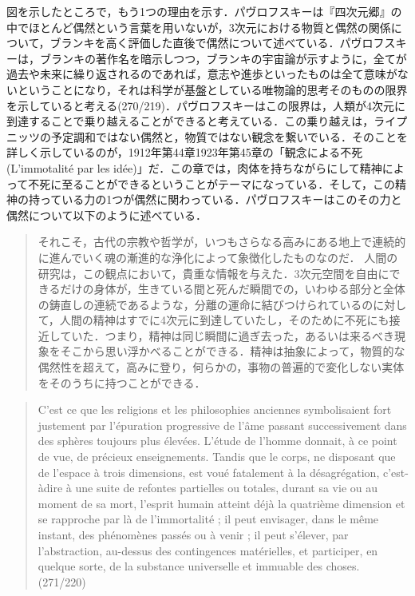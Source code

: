 図を示したところで，もう1つの理由を示す．パヴロフスキーは『四次元郷』の中でほとんど偶然という言葉を用いないが，3次元における物質と偶然の関係について，ブランキを高く評価した直後で偶然について述べている．パヴロフスキーは，ブランキの著作名を暗示しつつ，ブランキの宇宙論が示すように，全てが過去や未来に繰り返されるのであれば，意志や進歩といったものは全て意味がないということになり，それは科学が基盤としている唯物論的思考そのものの限界を示していると考える(270/219)．パヴロフスキーはこの限界は，人類が4次元に到達することで乗り越えることができると考えている．この乗り越えは，ライプニッツの予定調和ではない偶然と，物質ではない観念を繋いでいる．そのことを詳しく示しているのが，1912年第44章1923年第45章の「観念による不死(L'immotalité par les idée)」だ．この章では，肉体を持ちながらにして精神によって不死に至ることができるということがテーマになっている．そして，この精神の持っている力の1つが偶然に関わっている．パヴロフスキーはこのその力と偶然について以下のように述べている．

\begin{quote}
それこそ，古代の宗教や哲学が，いつもさらなる高みにある地上で連続的に進んでいく魂の漸進的な浄化によって象徴化したものなのだ． 人間の研究は，この観点において，貴重な情報を与えた．3次元空間を自由にできるだけの身体が，生きている間と死んだ瞬間での，いわゆる部分と全体の鋳直しの連続であるような，分離の運命に結びつけられているのに対して，人間の精神はすでに4次元に到達していたし，そのために不死にも接近していた．つまり，精神は同じ瞬間に過ぎ去った，あるいは来るべき現象をそこから思い浮かべることができる．精神は抽象によって，物質的な偶然性を超えて，高みに登り，何らかの，事物の普遍的で変化しない実体をそのうちに持つことができる．
\end{quote}
\begin{quote}
C'est ce que les religions et les philosophies anciennes symbolisaient fort justement par l'épuration progressive de l'âme passant successivement dans des sphères toujours plus élevées. L'étude de l'homme donnait, à ce point de vue, de précieux enseignements. Tandis que le corps, ne disposant que de l'espace à trois dimensions, est voué fatalement à la désagrégation, c'est-àdire à une suite de refontes partielles ou totales, durant sa vie ou au moment de sa mort, l'esprit humain atteint déjà la quatrième dimension et se rapproche par là de l'immortalité ; il peut envisager, dans le même instant, des phénomènes passés ou à venir ; il peut s'élever, par l'abstraction, au-dessus des contingences matérielles, et participer, en quelque sorte, de la substance universelle et immuable des choses. (271/220) 
\end{quote}

